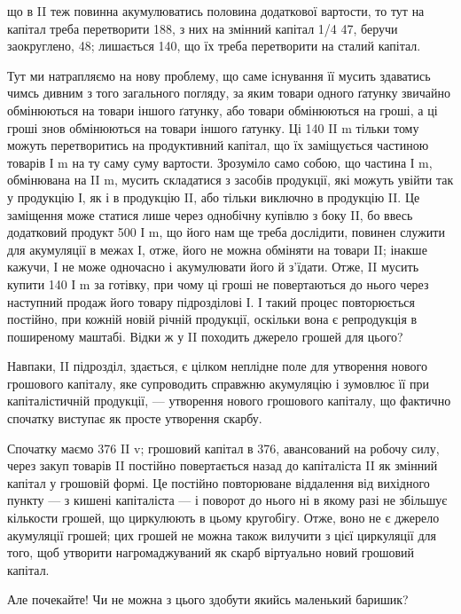 \parcont{}  %
що в II теж повинна акумулюватись половина додаткової вартости,
то тут на капітал треба перетворити 188, з них на змінний капітал
1/4 \deq{} 47, беручи заокруглено, 48; лишається 140, що їх треба
перетворити на сталий капітал.

Тут ми натрапляємо на нову проблему, що саме існування її мусить
здаватись чимсь дивним з того загального погляду, за яким
товари одного ґатунку звичайно обмінюються на товари іншого ґатунку,
або товари обмінюються на гроші, а ці гроші знов обмінюються на
товари іншого ґатунку. Ці 140 II m тільки тому можуть перетворитись
на продуктивний капітал, що їх заміщується частиною товарів І m на
ту саму суму вартости. Зрозуміло само собою, що частина І m, обмінювана
на II m, мусить складатися з засобів продукції, які можуть
увійти так у продукцію І, як і в продукцію II, або тільки виключно
в продукцію II. Це заміщення може статися лише через
однобічну купівлю з боку II, бо ввесь додатковий продукт 500 І m, що
його нам ще треба дослідити, повинен служити для акумуляції в межах І,
отже, його не можна обміняти на товари II; інакше кажучи, І не може
одночасно і акумулювати його й з’їдати. Отже, II мусить купити 140 І m
за готівку, при чому ці гроші не повертаються до нього через наступний
продаж його товару підрозділові І. І такий процес повторюється постійно,
при кожній новій річній продукції, оскільки вона є репродукція в поширеному
маштабі. Відки ж у II походить джерело грошей для цього?

Навпаки, II підрозділ, здається, є цілком неплідне поле для утворення
нового грошового капіталу, яке супроводить справжню акумуляцію і
зумовлює її при капіталістичній продукції, — утворення нового грошового
капіталу, що фактично спочатку виступає як просте утворення
скарбу.

Спочатку маємо 376 II v; грошовий капітал в 376, авансований на
робочу силу, через закуп товарів II постійно повертається назад до
капіталіста II як змінний капітал у грошовій формі. Це постійно повторюване
віддалення від вихідного пункту — з кишені капіталіста — і поворот
до нього ні в якому разі не збільшує кількости грошей, що
циркулюють в цьому кругобігу. Отже, воно не є джерело акумуляції
грошей; цих грошей не можна також вилучити з цієї циркуляції для
того, щоб утворити нагромаджуваний як скарб віртуально новий грошовий
капітал.

Але почекайте! Чи не можна з цього здобути якийсь маленький
баришик?


